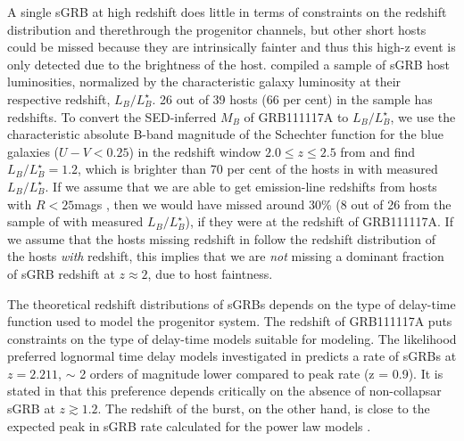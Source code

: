 \documentclass{aa}    %
\newcommand\todo[1]{\textbf{(#1)}}
\begin{document}
A single sGRB at high redshift does little in terms of constraints on the redshift distribution and therethrough the progenitor channels, but other short hosts could be missed because they are intrinsically fainter and thus this high-z event is only detected due to the brightness of the host. \citet{Berger2014} compiled a sample of sGRB host luminosities, normalized by the characteristic galaxy luminosity at their respective redshift, $L_B/L^{\star}_{B}$. 26 out of 39 hosts (66 per cent) in the sample has redshifts. To convert the SED-inferred $M_B$ of GRB111117A to $L_B/L^{\star}_{B}$, we use the characteristic absolute B-band magnitude of the Schechter function for the blue galaxies ($U - V < 0.25$) in the redshift window $2.0 \leq z \leq 2.5$ from \citet{Marchesini2007} and find $L_B/L^{\star}_{B} = 1.2$, which is brighter than 70 per cent of the hosts in \citet{Berger2014} with measured $L_B/L^{\star}_{B}$. If we assume that we are able to get emission-line redshifts from hosts with $R < 25 $mags \citep{Kruhler2012}, then we would have missed around 30\% (8 out of 26 from the sample of \citealt{Berger2014} with measured $L_B/L^{\star}_{B}$), if they were at the redshift of GRB111117A. If we assume that the hosts missing redshift in \citet{Berger2014} follow the redshift distribution of the hosts \textit{with} redshift, this implies that we are \textit{not} missing a dominant fraction of sGRB redshift at $z \approx 2$, due to host faintness. 

The theoretical redshift distributions of sGRBs depends on the type of delay-time function used to model the progenitor system. The redshift of GRB111117A puts constraints on the type of delay-time models suitable for modeling. The likelihood preferred lognormal time delay models investigated in \citet{Wanderman2015} predicts a rate of sGRBs at $z = 2.211$, $\sim$ 2 orders of magnitude lower compared to peak rate (z = 0.9). It is stated in \citet{Wanderman2015} that this preference depends critically on the absence of non-collapsar sGRB at $z \gtrsim 1.2$. The redshift of the burst, on the other hand, is close to the expected peak in sGRB rate calculated for the power law models \citep{Behroozi2014, Wanderman2015}. 



\end{document}
